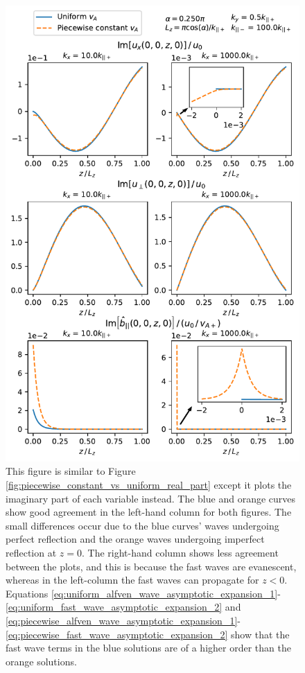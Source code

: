 \documentclass[linenumbers]{aastex63}
\begin{document}
\begin{figure}
    \centering
    \includegraphics[width=\textwidth,height=0.88\textheight,keepaspectratio]{piecewise_constant_vs_uniform_imag_part.pdf}
    \caption{This figure is similar to Figure \ref{fig:piecewise_constant_vs_uniform_real_part} except it plots the imaginary part of each variable instead. The blue and orange curves show good agreement in the left-hand column for both figures. The small differences occur due to the blue curves' waves undergoing perfect reflection and the orange waves undergoing imperfect reflection at $z=0$. The right-hand column shows less agreement between the plots, and this is because the fast waves are evanescent, whereas in the left-column the fast waves can propagate for $z<0$. Equations  \eqref{eq:uniform_alfven_wave_asymptotic_expansion_1}-\eqref{eq:uniform_fast_wave_asymptotic_expansion_2} and \eqref{eq:piecewise_alfven_wave_asymptotic_expansion_1}-\eqref{eq:piecewise_fast_wave_asymptotic_expansion_2} show that the fast wave terms in the blue solutions are of a higher order than the orange solutions.}
    \label{fig:piecewise_constant_vs_uniform_imag_part}
\end{figure}
\end{document}
